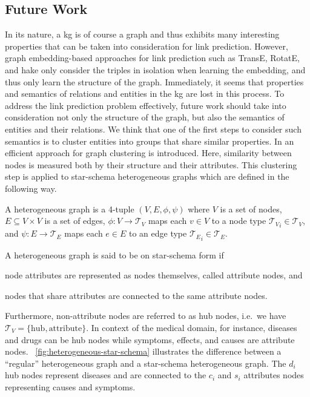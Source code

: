 \subsection{Future Work}

In its nature, a \ac{kg} is of course a graph and thus exhibits many interesting properties that can be taken into consideration for link prediction.
However, graph embedding-based approaches for link prediction such as TransE, RotatE, and \ac{hake} only consider the triples in isolation when learning the embedding, and thus only learn the structure of the graph.
Immediately, it seems that properties and semantics of relations and entities in the \ac{kg} are lost in this process.
To address the link prediction problem effectively, future work should take into consideration not only the structure of the graph, but also the semantics of entities and their relations.
We think that one of the first steps to consider such semantics is to cluster entities into groups that share similar properties.
In\cite{Chen2019} an efficient approach for graph clustering is introduced.
Here, similarity between nodes is measured both by their structure and their attributes.
This clustering step is applied to star-schema heterogeneous graphs which are defined in the following way.

\begin{definition}
  A heterogeneous graph is a 4-tuple $(V, E, \phi, \psi)$ where $V$ is a set of nodes, $E \subseteq V \times V$ is a set of edges, $\phi \colon V \rightarrow \mathcal{T}_V$ maps each $v \in V$ to a node type ${\mathcal{T}_V}_i \in \mathcal{T}_V$, and $\psi \colon E \rightarrow \mathcal{T}_E$ maps each $e \in E$ to an edge type ${\mathcal{T}_E}_i \in \mathcal{T}_E$.
\end{definition}

A heterogeneous graph is said to be on star-schema form if
\begin{enumerate*}
  \item node attributes are represented as nodes themselves, called attribute nodes, and
  \item nodes that share attributes are connected to the same attribute nodes.
\end{enumerate*}
Furthermore, non-attribute nodes are referred to as hub nodes, i.e.\ we have $\mathcal{T}_V = \{\text{hub}, \text{attribute}\}$.
In context of the medical domain, for instance, diseases and drugs can be hub nodes while symptoms, effects, and causes are attribute nodes.
\figurename~\ref{fig:heterogeneous-star-schema} illustrates the difference between a \enquote{regular} heterogeneous graph and a star-schema heterogeneous graph.
The $d_i$ hub nodes represent diseases and are connected to the $c_i$ and $s_i$ attributes nodes representing causes and symptoms.

